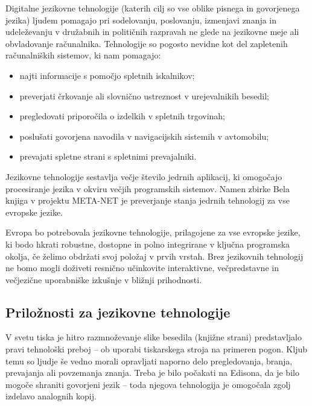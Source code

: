 \begin{multicols}{2}
Digitalne jezikovne tehnologije (katerih cilj so vse oblike pisnega in govorjenega jezika) ljudem pomagajo pri sodelovanju, poslovanju, izmenjavi znanja in udeleževanju v družabnih in političnih razpravah ne glede na jezikovne meje ali obvladovanje računalnika. Tehnologije so pogosto nevidne kot del zapletenih računalniških sistemov, ki nam pomagajo:

\begin{itemize}
\item najti informacije s pomočjo spletnih iskalnikov;
\item preverjati črkovanje ali slovnično ustreznost v urejevalnikih besedil;
\item pregledovati priporočila o izdelkih v spletnih trgovinah;
\item poslušati govorjena navodila v navigacijskih sistemih v avtomobilu;
\item prevajati spletne strani s spletnimi prevajalniki.
\end{itemize}

Jezikovne tehnologije sestavlja večje število jedrnih aplikacij, ki omogočajo procesiranje jezika v okviru večjih programskih sistemov. Namen zbirke Bela knjiga v projektu META-NET je preverjanje stanja jedrnih tehnologij za vse evropske jezike. 


Evropa bo potrebovala jezikovne tehnologije, prilagojene za vse evropske jezike, ki bodo hkrati robustne, dostopne in polno integrirane v ključna programska okolja, če želimo obdržati svoj položaj v prvih vrstah. Brez jezikovnih tehnologij ne bomo mogli doživeti resnično učinkovite interaktivne, večpredstavne in večjezične uporabniške izkušnje v bližnji prihodnosti.

\subsection{Priložnosti za jezikovne tehnologije}

V svetu tiska  je hitro razmnoževanje slike besedila (knjižne strani) predstavljalo pravi tehnološki preboj – ob uporabi tiskarskega stroja na primeren pogon. Kljub temu so ljudje še vedno morali opravljati naporno delo pregledovanja, branja, prevajanja ali povzemanja znanja. Treba je bilo počakati na Edisona, da je bilo mogoče shraniti govorjeni jezik – toda njegova tehnologija je omogočala zgolj izdelavo analognih kopij.


\end{multicols}

